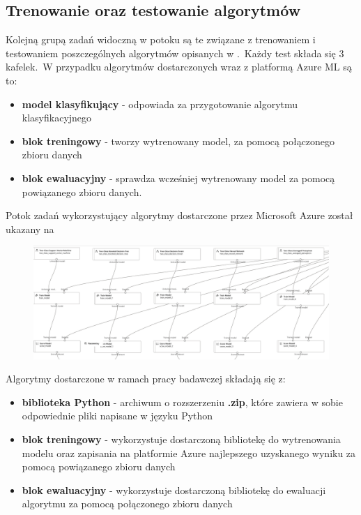 \vfill
\pagebreak

\subsection{Trenowanie oraz testowanie algorytmów}
Kolejną grupą zadań widoczną w potoku są te związane z trenowaniem i testowaniem poszczególnych algorytmów opisanych w .\ Każdy test składa się 3 kafelek.\ W przypadku algorytmów dostarczonych wraz z platformą Azure ML są to:
\begin{itemize}
    \item \textbf{model klasyfikujący} - odpowiada za przygotowanie algorytmu klasyfikacyjnego
    \item \textbf{blok treningowy} - tworzy wytrenowany model, za pomocą połączonego zbioru danych
    \item \textbf{blok ewaluacyjny} - sprawdza wcześniej wytrenowany model za pomocą powiązanego zbioru danych.
\end{itemize}
Potok zadań wykorzystujący algorytmy dostarczone przez Microsoft Azure został ukazany na 

\begin{figure}[H]
    \centering
    \includegraphics[width=\textwidth]{images/ms_pipe}
    \label{fig:ms-pipe}
\end{figure}

Algorytmy dostarczone w ramach pracy badawczej składają się z:
\begin{itemize}
    \item \textbf{biblioteka Python} - archiwum o rozszerzeniu \textbf{.zip}, które zawiera w sobie odpowiednie pliki napisane w języku Python
    \item \textbf{blok treningowy} - wykorzystuje dostarczoną bibliotekę do wytrenowania modelu oraz zapisania na platformie Azure najlepszego uzyskanego wyniku za pomocą powiązanego zbioru danych
    \item \textbf{blok ewaluacyjny} - wykorzystuje dostarczoną bibliotekę do ewaluacji algorytmu za pomocą połączonego zbioru danych
\end{itemize}

